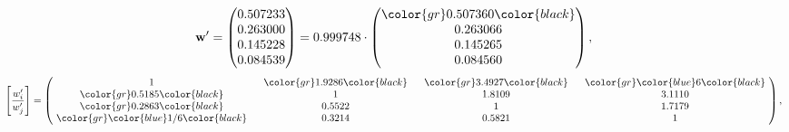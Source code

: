 \begin{example}
\begin{equation*}
\mathbf{w}^{\prime} =
\begin{pmatrix}
0.507233\\
0.263000\\
0.145228\\
0.084539
\end{pmatrix} =
0.999748\cdot
\begin{pmatrix}
\color{gr} 0.507360\color{black} \\
0.263066\\
0.145265\\
0.084560
\end{pmatrix},
\end{equation*}
\begin{equation*}
\left[ \frac{{w}^{\prime}_i}{{w}^{\prime}_j} \right] =
\begin{pmatrix}
$\,\,$ 1 $\,\,$ & $\,\,$\color{gr} 1.9286\color{black} $\,\,$ & $\,\,$\color{gr} 3.4927\color{black} $\,\,$ & $\,\,$\color{gr} \color{blue} 6\color{black} $\,\,$ \\
$\,\,$\color{gr} 0.5185\color{black} $\,\,$ & $\,\,$ 1 $\,\,$ & $\,\,$1.8109$\,\,$ & $\,\,$3.1110  $\,\,$ \\
$\,\,$\color{gr} 0.2863\color{black} $\,\,$ & $\,\,$0.5522$\,\,$ & $\,\,$ 1 $\,\,$ & $\,\,$1.7179 $\,\,$ \\
$\,\,$\color{gr} \color{blue}  1/6\color{black} $\,\,$ & $\,\,$0.3214$\,\,$ & $\,\,$0.5821$\,\,$ & $\,\,$ 1  $\,\,$ \\
\end{pmatrix},
\end{equation*}
\end{example}
\newpage
